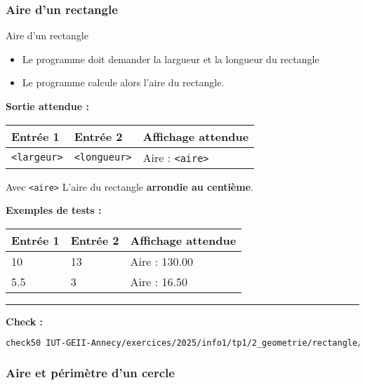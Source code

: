 \subsubsection{Aire d'un rectangle}
\begin{UPSTIcahierDesCharges}{Aire d'un rectangle}
	\begin{itemize}
		\item Le programme doit demander la largueur et la longueur du rectangle
		\item Le programme calcule alors l'aire du rectangle.
	\end{itemize}
	\textbf{Sortie attendue :}
	\begin{center}
		\begin{tabular}{|l|l|l|}
			\hline
			Entrée 1           & Entrée 2            & Affichage attendue     \\
			\hline
			\texttt{<largeur>} & \texttt{<longueur>} & Aire : \texttt{<aire>} \\
			\hline
		\end{tabular}
	\end{center}
	Avec \texttt{<aire>} L'aire du rectangle \textbf{arrondie au centième}.

	\textbf{Exemples de tests :}
	\begin{center}
		\begin{tabular}{|l|l|l|}
			\hline
			Entrée 1 & Entrée 2 & Affichage attendue \\
			\hline
			10       & 13       & Aire : 130.00      \\
			5.5      & 3        & Aire : 16.50       \\
			\hline
		\end{tabular}
	\end{center}
	\hrule
	\textbf{Check :}
	\begin{lstlisting}[language=bash,style=console]
check50 IUT-GEII-Annecy/exercices/2025/info1/tp1/2_geometrie/rectangle/niveau1
\end{lstlisting}
\end{UPSTIcahierDesCharges}





\subsubsection{Aire et périmètre d'un cercle}

